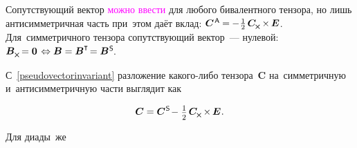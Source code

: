 \begin{otherlanguage}{russian}
\vspace{-0.6em} Сопутствующий вектор \textcolor{magenta}{можно ввести} для любого бивалентного тензора, но лишь антисимметричная часть при~этом даёт вклад: ${\bm{C}^{\hspace{.2ex}\mathsf{A}} \hspace{-0.1ex} = \hspace{-0.1ex} - \hspace{.1ex}\onehalf\hspace{.32ex} \bm{C}_{\hspace{-0.1ex}\Xcompanion} \hspace{-0.16ex} \times \hspace{-0.16ex} \bm{E}}$. Для~симметричного тензора сопутствующий вектор~--- нулевой: ${\bm{B}_{\Xcompanion} \hspace{-0.25ex} = \bm{0} \hspace{.25ex} \Leftrightarrow \bm{B} = \bm{B}^{\T} \hspace{-0.32ex} = \bm{B}^{\mathsf{\hspace{.1ex}S}}\hspace{-0.32ex}}$.

С~\eqref{pseudovectorinvariant} разложение какого\hbox{-}либо тензора~$\bm{C}$ на~симметричную и~антисимметричную части выглядит как

\nopagebreak\vspace{-0.1em}\begin{equation}\label{symmetricantisymmetricdecompositionofsometensor}
\bm{C} = \bm{C}^{\mathsf{\hspace{.1ex}S}} \hspace{-0.32ex} - \hspace{.1ex} \smalldisplaystyleonehalf \hspace{.32ex} \bm{C}_{\hspace{-0.1ex}\Xcompanion} \hspace{-0.16ex} \times \hspace{-0.16ex} \bm{E} \hspace{.1ex} .
\end{equation}

\vspace{-0.8em}\noindent Для диады~же


\end{otherlanguage}
